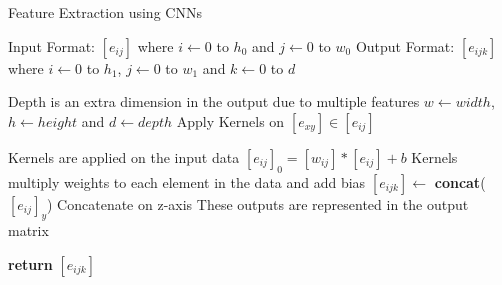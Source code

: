 \documentclass{article}[12pt]
\begin{document}
    \begin{algorithm}
        \caption{Feature Extraction using CNNs}
        \begin{algorithmic}[1]
            \State Input Format: $[e_{ij}]$ where $i \gets 0$ to $h_0$ and $j \gets 0$ to $w_0$
            \State Output Format: $[e_{ijk}]$ where $i \gets 0$ to $h_1$, $j \gets 0$ to $w_1$ and $k \gets 0$ to $d$

            \Comment Depth is an extra dimension in the output due to multiple features
            \State $w \gets width$, $h \gets height$ and $d \gets depth$
            \State Apply Kernels on $[e_{xy}] \in [e_{ij}]$ 

            \State \Comment Kernels are applied on the input data
            \State $[e_{ij}]_0 = [w_{ij}] * [e_{ij}] + b$
            \State \Comment Kernels multiply weights to each element in the data and add bias
            \State $[e_{ijk}] \gets$ \textbf{concat}($[e_{ij}]_y$) \Comment Concatenate on z-axis
            \State \Comment These outputs are represented in the output matrix

            \State \textbf{return} $[e_{ijk}]$


            \EndProcedure
            
        \end{algorithmic}
    \end{algorithm}
    
\end{document}
